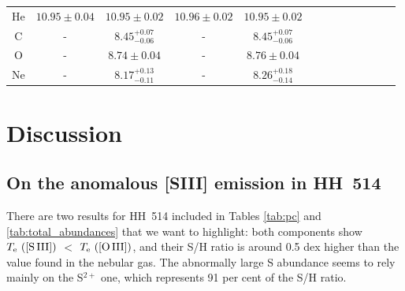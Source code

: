 \documentclass[fleqn,usenatbib]{mnras}
\begin{document}
\begin{table}
\begin{tabular}{ccccccccccccc}
He  &$10.95 \pm 0.04$  & $10.95 \pm 0.02$ & $10.96 \pm 0.02$ & $10.95 \pm 0.02$\\

C & - &$8.45 ^{+0.07} _{-0.06}$&-&$8.45 ^{+0.07} _{-0.06}$\\ 

O  &  - & $8.74 \pm 0.04$ &-&$8.76 \pm 0.04$\\ 

Ne  & - &$8.17 ^{+0.13} _{-0.11}$&-&$8.26 ^{+0.18} _{-0.14}$\\

\hline
\end{tabular}
\end{table}


\section{Discussion}
\label{sec:disc}


\subsection{On the anomalous [S\thinspace III] emission in HH~514}
\label{subsec:under_TS3}

There are two results for HH~514 included in Tables \ref{tab:pc} and \ref{tab:total_abundances}  that we want to highlight: both components show $T_{\rm e} \text{ ([S\thinspace III])}$ $<$ $T_{\rm e} \text{ ([O\thinspace III])}$, and their S/H ratio is around 0.5 dex higher than the value found in the nebular gas. The abnormally large S abundance seems to rely mainly on the S$^{2+}$ one, which represents 91 per cent of the S/H ratio.
\end{document}
